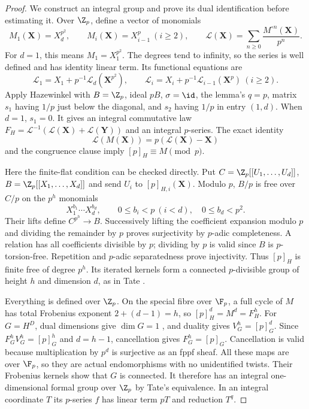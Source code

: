 \begin{proof}
We construct an integral group and prove its dual identification before estimating it. Over $\Z_p$, define a vector of monomials
\[
 M_1(\mathbf X)=X_d^{p^2},\qquad M_i(\mathbf X)=X_{i-1}^p\ (i\ge2),
 \qquad \mathcal L(\mathbf X)=\sum_{n\ge0}\frac{M^{\circ n}(\mathbf X)}{p^n}.
\]
For $d=1$, this means $M_1=X_1^{p^2}$. The degrees tend to infinity, so the series is well defined and has identity linear term. Its functional equations are
\[
 \mathcal L_1=X_1+p^{-1}\mathcal L_d(\mathbf X^{p^2}),\qquad
 \mathcal L_i=X_i+p^{-1}\mathcal L_{i-1}(\mathbf X^p)\ (i\ge2).
\]
Apply Hazewinkel \cite[Lemma 2.3, (2.2)--(2.6), p.~74]{Hazewinkel} with $B=\Z_p$, ideal $pB$, $\sigma=\id$, the lemma's $q=p$, matrix $s_1$ having $1/p$ just below the diagonal, and $s_2$ having $1/p$ in entry $(1,d)$. When $d=1$, $s_1=0$. It gives an integral commutative law $F_H=\mathcal L^{-1}(\mathcal L(\mathbf X)+\mathcal L(\mathbf Y))$ and an integral $p$-series. The exact identity
\[
 \mathcal L(M(\mathbf X))=p(\mathcal L(\mathbf X)-\mathbf X)
\]
and the congruence clause \cite[(2.8), p.~75]{Hazewinkel} imply $[p]_H\equiv M\pmod p$.

Here the finite-flat condition can be checked directly. Put $C=\Z_p[[U_1,\ldots,U_d]]$, $B=\Z_p[[X_1,\ldots,X_d]]$ and send $U_i$ to $[p]_{H,i}(\mathbf X)$. Modulo $p$, $B/p$ is free over $C/p$ on the $p^h$ monomials
\[
 X_1^{b_1}\cdots X_d^{b_d},\qquad
 0\le b_i<p\ (i<d),\quad 0\le b_d<p^2.
\]
Their lifts define $C^{p^h}\to B$. Successively lifting the coefficient expansion modulo $p$ and dividing the remainder by $p$ proves surjectivity by $p$-adic completeness. A relation has all coefficients divisible by $p$; dividing by $p$ is valid since $B$ is $p$-torsion-free. Repetition and $p$-adic separatedness prove injectivity. Thus $[p]_H$ is finite free of degree $p^h$. Its iterated kernels form a connected $p$-divisible group of height $h$ and dimension $d$, as in Tate \cite[\S2.2, Proposition 1, pp.~162--164]{Tate67}.

Everything is defined over $\Z_p$. On the special fibre over $\F_p$, a full cycle of $M$ has total Frobenius exponent $2+(d-1)=h$, so $[p]_H^d=M^d=F_H^h$. For $G=H^D$, dual dimensions give $\dim G=1$ \cite[\S2.3, Proposition 3, p.~166]{Tate67}, and duality gives $V_G^h=[p]_G^d$. Since $F_G^hV_G^h=[p]_G^h$ and $d=h-1$, cancellation gives $F_G^h=[p]_G$. Cancellation is valid because multiplication by $p^d$ is surjective as an fppf sheaf. All these maps are over $\F_p$, so they are actual endomorphisms with no unidentified twists. Their Frobenius kernels show that $G$ is connected. It therefore has an integral one-dimensional formal group over $\Z_p$ by Tate's equivalence. In an integral coordinate $T$ its $p$-series $f$ has linear term $pT$ and reduction $T^q$.


\end{proof}
